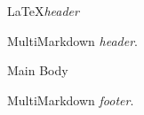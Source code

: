 
\def\mytitle{MMD Header and Footer}
\LaTeX \emph{header}


MultiMarkdown \emph{header}.

Main Body

MultiMarkdown \emph{footer}.



